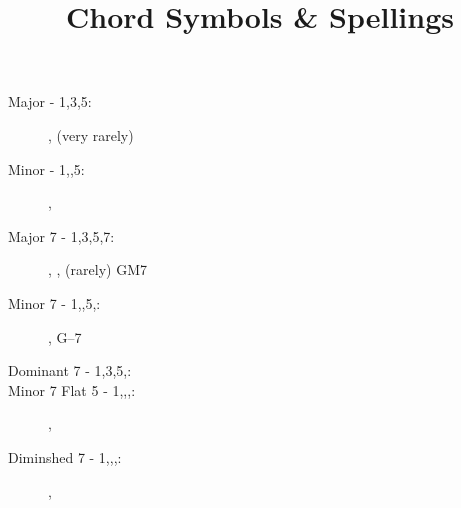 \documentclass{article}
\title{Chord Symbols \& Spellings}
\author{}
\date{}
\begin{document}
    \maketitle
    \thispagestyle{empty}
    \huge\begin{description}
        \item[Major - 1,3,5:] , (very rarely) 
        \item[Minor - 1,,5:] , 
        \item[Major 7 - 1,3,5,7:] , , (rarely) GM7
        \item[Minor 7 - 1,,5,:] , G--7
        \item[Dominant 7 - 1,3,5,:] 
        \item[Minor 7 Flat 5 - 1,,,:] , 
        \item[Diminshed 7 - 1,,,:] , 
    \end{description}
\end{document}
